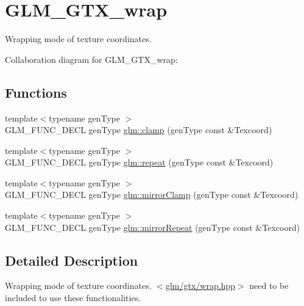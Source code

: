 \hypertarget{group__gtx__wrap}{\section{G\-L\-M\-\_\-\-G\-T\-X\-\_\-wrap}
\label{group__gtx__wrap}
}


Wrapping mode of texture coordinates.  


Collaboration diagram for G\-L\-M\-\_\-\-G\-T\-X\-\_\-wrap\-:
\subsection*{Functions}
\begin{DoxyCompactItemize}
\item 
{\footnotesize template$<$typename gen\-Type $>$ }\\G\-L\-M\-\_\-\-F\-U\-N\-C\-\_\-\-D\-E\-C\-L gen\-Type \hyperlink{group__gtx__wrap_ga6c0cc6bd1d67ea1008d2592e998bad33}{glm\-::clamp} (gen\-Type const \&Texcoord)
\item 
{\footnotesize template$<$typename gen\-Type $>$ }\\G\-L\-M\-\_\-\-F\-U\-N\-C\-\_\-\-D\-E\-C\-L gen\-Type \hyperlink{group__gtx__wrap_ga809650c6310ea7c42666e918c117fb6f}{glm\-::repeat} (gen\-Type const \&Texcoord)
\item 
{\footnotesize template$<$typename gen\-Type $>$ }\\G\-L\-M\-\_\-\-F\-U\-N\-C\-\_\-\-D\-E\-C\-L gen\-Type \hyperlink{group__gtx__wrap_gaa6856a0a048d2749252848da35e10c8b}{glm\-::mirror\-Clamp} (gen\-Type const \&Texcoord)
\item 
{\footnotesize template$<$typename gen\-Type $>$ }\\G\-L\-M\-\_\-\-F\-U\-N\-C\-\_\-\-D\-E\-C\-L gen\-Type \hyperlink{group__gtx__wrap_ga16a89b0661b60d5bea85137bbae74d73}{glm\-::mirror\-Repeat} (gen\-Type const \&Texcoord)
\end{DoxyCompactItemize}


\subsection{Detailed Description}
Wrapping mode of texture coordinates. $<$\hyperlink{wrap_8hpp}{glm/gtx/wrap.\-hpp}$>$ need to be included to use these functionalities. 

